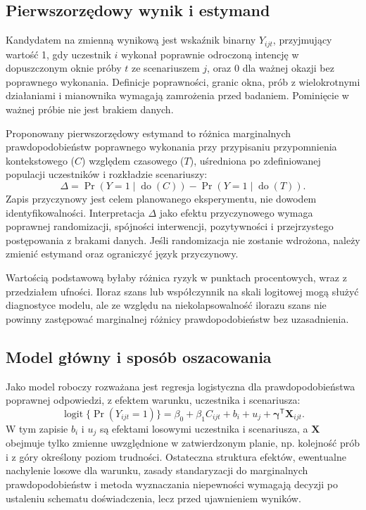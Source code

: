 \documentclass[11pt,a4paper]{article}
\begin{document}
\subsection{Pierwszorzędowy wynik i estymand}
Kandydatem na zmienną wynikową jest wskaźnik binarny \(Y_{ijt}\), przyjmujący wartość 1, gdy uczestnik \(i\) wykonał poprawnie odroczoną intencję w dopuszczonym oknie próby \(t\) ze scenariuszem \(j\), oraz 0 dla ważnej okazji bez poprawnego wykonania. Definicje poprawności, granic okna, prób z wielokrotnymi działaniami i mianownika wymagają zamrożenia przed badaniem. Pominięcie w ważnej próbie nie jest brakiem danych.

Proponowany pierwszorzędowy estymand to różnica marginalnych prawdopodobieństw poprawnego wykonania przy przypisaniu przypomnienia kontekstowego (\(C\)) względem czasowego (\(T\)), uśredniona po zdefiniowanej populacji uczestników i rozkładzie scenariuszy:
\[
\Delta = \Pr(Y=1\mid \operatorname{do}(C))-\Pr(Y=1\mid \operatorname{do}(T)).
\]
Zapis przyczynowy jest celem planowanego eksperymentu, nie dowodem identyfikowalności. Interpretacja \(\Delta\) jako efektu przyczynowego wymaga poprawnej randomizacji, spójności interwencji, pozytywności i przejrzystego postępowania z brakami danych. Jeśli randomizacja nie zostanie wdrożona, należy zmienić estymand oraz ograniczyć język przyczynowy.

Wartością podstawową byłaby różnica ryzyk w punktach procentowych, wraz z przedziałem ufności. Iloraz szans lub współczynnik na skali logitowej mogą służyć diagnostyce modelu, ale ze względu na niekolapsowalność ilorazu szans nie powinny zastępować marginalnej różnicy prawdopodobieństw bez uzasadnienia.

\subsection{Model główny i sposób oszacowania}
Jako model roboczy rozważana jest regresja logistyczna dla prawdopodobieństwa poprawnej odpowiedzi, z efektem warunku, uczestnika i scenariusza:
\[
\operatorname{logit}\{\Pr(Y_{ijt}=1)\}
 = \beta_0+\beta_1 C_{ijt}+b_i+u_j+\boldsymbol{\gamma}^{\mathsf T}\mathbf X_{ijt}.
\]
W tym zapisie \(b_i\) i \(u_j\) są efektami losowymi uczestnika i scenariusza, a \(\mathbf X\) obejmuje tylko zmienne uwzględnione w zatwierdzonym planie, np. kolejność prób i z góry określony poziom trudności. Ostateczna struktura efektów, ewentualne nachylenie losowe dla warunku, zasady standaryzacji do marginalnych prawdopodobieństw i metoda wyznaczania niepewności wymagają decyzji po ustaleniu schematu doświadczenia, lecz przed ujawnieniem wyników.
\end{document}
